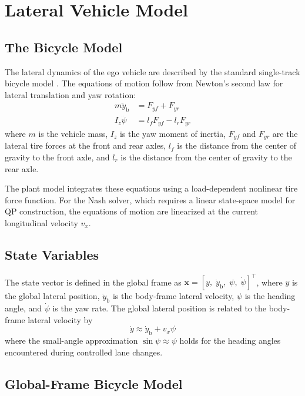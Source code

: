 \documentclass[12pt,a4paper,oneside]{report}
\begin{document}
\section{Lateral Vehicle Model}
\label{sec:lat_vehicle_model}

\subsection{The Bicycle Model}

The lateral dynamics of the ego vehicle are described by the standard single-track bicycle
model \cite{rajamaniVehicleDynamicsControl2005}. The equations of motion follow from Newton's second law
for lateral translation and yaw rotation:
\begin{align}
m \ddot{y}_{\text{b}} &= F_{yf} + F_{yr} \label{eq:lat_force} \\
I_z \ddot{\psi}        &= l_f F_{yf} - l_r F_{yr} \label{eq:yaw_moment}
\end{align}
where $m$ is the vehicle mass, $I_z$ is the yaw moment of inertia, $F_{yf}$ and $F_{yr}$
are the lateral tire forces at the front and rear axles, $l_f$ is the distance from the
center of gravity to the front axle, and $l_r$ is the distance from the center of gravity
to the rear axle.

The plant model integrates these equations using a load-dependent nonlinear tire force
function. For the Nash solver, which requires a linear state-space model for QP
construction, the equations of motion are linearized at the current longitudinal
velocity $v_x$.

\subsection{State Variables}

The state vector is defined in the global frame as
$\mathbf{x} = [y,\; \dot{y}_{\text{b}},\; \psi,\; \dot{\psi}]^{\top}$,
where $y$ is the global lateral position, $\dot{y}_{\text{b}}$ is the body-frame lateral
velocity, $\psi$ is the heading angle, and $\dot{\psi}$ is the yaw rate. The global lateral
position is related to the body-frame lateral velocity by
\begin{equation}
\dot{y} \approx \dot{y}_{\text{b}} + v_x \psi
\label{eq:global_y}
\end{equation}
where the small-angle approximation $\sin\psi \approx \psi$ holds for the heading angles
encountered during controlled lane changes.

\subsection{Global-Frame Bicycle Model}
\end{document}
